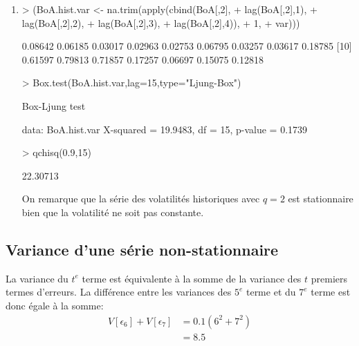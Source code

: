 \documentclass{article}
\begin{document}
\begin{enumerate}
\item
\begin{Schunk}
\begin{Sinput}
> (BoA.hist.var <- na.trim(apply(cbind(BoA[,2],
+                                      lag(BoA[,2],1),
+                                      lag(BoA[,2],2),
+                                      lag(BoA[,2],3),
+                                      lag(BoA[,2],4)),
+                                1,
+                                var)))
\end{Sinput}
\begin{Soutput}
 [1] 0.08642 0.06185 0.03017 0.02963 0.02753 0.06795 0.03257 0.03617 0.18785
[10] 0.61597 0.79813 0.71857 0.17257 0.06697 0.15075 0.12818
\end{Soutput}
\begin{Sinput}
> Box.test(BoA.hist.var,lag=15,type="Ljung-Box")
\end{Sinput}
\begin{Soutput}
	Box-Ljung test

data:  BoA.hist.var 
X-squared = 19.9483, df = 15, p-value = 0.1739
\end{Soutput}
\begin{Sinput}
> qchisq(0.9,15)
\end{Sinput}
\begin{Soutput}
[1] 22.30713
\end{Soutput}
\end{Schunk}

On remarque que la série des volatilités historiques avec $q=2$ est stationnaire bien que la volatilité ne soit pas constante.
  
\end{enumerate}

\clearpage
\subsection{Variance d'une série non-stationnaire}

La variance du $t^e$ terme est équivalente à la somme de la variance des $t$ premiers termes d'erreurs. La différence entre les variances des $5^e$ terme et du $7^e$ terme est donc égale à la somme:
\begin{align*}
  \label{eq:2}
  V\left[\epsilon_6\right]+V\left[\epsilon_7\right] &= 0.1(6^2+7^2) \\
  & = 8.5
\end{align*}

\clearpage


\end{document}
